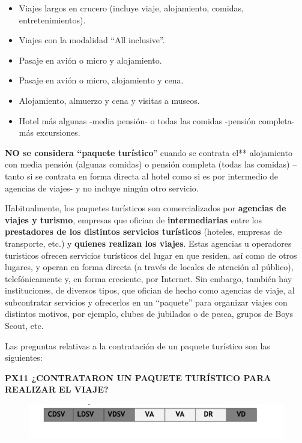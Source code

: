 \documentclass[
  openany]{book}
\begin{document}
\begin{itemize}
\item
  Viajes largos en crucero (incluye viaje, alojamiento, comidas, entretenimientos).
\item
  Viajes con la modalidad ``All inclusive''.
\item
  Pasaje en avión o micro y alojamiento.
\item
  Pasaje en avión o micro, alojamiento y cena.
\item
  Alojamiento, almuerzo y cena y visitas a museos.
\item
  Hotel más algunas -media pensión- o todas las comidas -pensión completa- más excursiones.
\end{itemize}

\textbf{NO se considera ``paquete turístico}'' cuando se contrata el** alojamiento con media pensión (algunas comidas) o pensión completa (todas las comidas) -- tanto si se contrata en forma directa al hotel como si es por intermedio de agencias de viajes- y no incluye ningún otro servicio.

Habitualmente, los paquetes turísticos son comercializados por \textbf{agencias de viajes y turismo}, empresas que ofician de \textbf{intermediarias} entre los \textbf{prestadores de los distintos servicios turísticos} (hoteles, empresas de transporte, etc.) y \textbf{quienes realizan los viajes}. Estas agencias u operadores turísticos ofrecen servicios turísticos del lugar en que residen, así como de otros lugares, y operan en forma directa (a través de locales de atención al público), telefónicamente y, en forma creciente, por Internet. Sin embargo, también hay instituciones, de diversos tipos, que ofician de hecho como agencias de viaje, al subcontratar servicios y ofrecerlos en un ``paquete'' para organizar viajes con distintos motivos, por ejemplo, clubes de jubilados o de pesca, grupos de Boys Scout, etc.

Las preguntas relativas a la contratación de un paquete turístico son las siguientes:

\textbf{PX11 ¿CONTRATARON UN PAQUETE TURÍSTICO PARA REALIZAR EL VIAJE?}

\begin{figure}

{\centering \includegraphics[width=1\linewidth]{imagenes/figura6-102} 

}

\end{figure}
\end{document}
